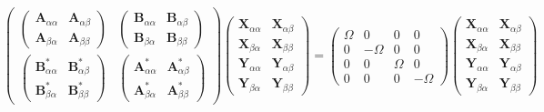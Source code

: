 \documentclass[12pt]{article}
\begin{document}
\begin{equation}
    \begin{pmatrix}
\begin{pmatrix}
    \mathbf{A}_{\alpha \alpha } & \mathbf{A}_{\alpha \beta } \\
    \mathbf{A}_{\beta \alpha } & \mathbf{A}_{\beta \beta }
\end{pmatrix}
&
\begin{pmatrix}
    \mathbf{B}_{\alpha \alpha } & \mathbf{B}_{\alpha \beta } \\
    \mathbf{B}_{\beta \alpha } & \mathbf{B}_{\beta \beta }
\end{pmatrix}
\\
\begin{pmatrix}
    \mathbf{B}_{\alpha \alpha }^{*} & \mathbf{B}_{\alpha \beta }^{*} \\
    \mathbf{B}_{\beta \alpha }^{*} & \mathbf{B}_{\beta \beta }^{*}
\end{pmatrix}
&
\begin{pmatrix}
    \mathbf{A}_{\alpha \alpha }^{*} & \mathbf{A}_{\alpha \beta }^{*} \\
    \mathbf{A}_{\beta \alpha }^{*} & \mathbf{A}_{\beta \beta }^{*}
\end{pmatrix}
\end{pmatrix}
    \begin{pmatrix}
        \mathbf{X}_{\alpha\alpha} & \mathbf{X}_{\alpha\beta}\\
        \mathbf{X}_{\beta\alpha} & \mathbf{X}_{\beta\beta}\\
        \mathbf{Y}_{\alpha\alpha} & \mathbf{Y}_{\alpha\beta}\\
        \mathbf{Y}_{\beta\alpha} & \mathbf{Y}_{\beta\beta}
    \end{pmatrix}
    =
    \begin{pmatrix}
        \Omega & 0 & 0 & 0\\
        0 & -\Omega & 0 & 0\\
        0 & 0 & \Omega & 0\\
        0 & 0 & 0 & -\Omega
    \end{pmatrix}
    \begin{pmatrix}
        \mathbf{X}_{\alpha\alpha} & \mathbf{X}_{\alpha\beta}\\
        \mathbf{X}_{\beta\alpha} & \mathbf{X}_{\beta\beta}\\
        \mathbf{Y}_{\alpha\alpha} & \mathbf{Y}_{\alpha\beta}\\
        \mathbf{Y}_{\beta\alpha} & \mathbf{Y}_{\beta\beta}
    \end{pmatrix}
\end{equation}
\end{document}
